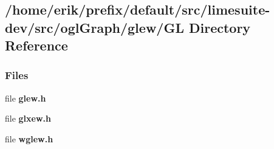 \subsection{/home/erik/prefix/default/src/limesuite-\/dev/src/ogl\+Graph/glew/\+GL Directory Reference}
\label{dir_834fe72cf97613b38609dc6544718064}
\subsubsection*{Files}
\begin{DoxyCompactItemize}
\item 
file {\bf glew.\+h}
\item 
file {\bf glxew.\+h}
\item 
file {\bf wglew.\+h}
\end{DoxyCompactItemize}
